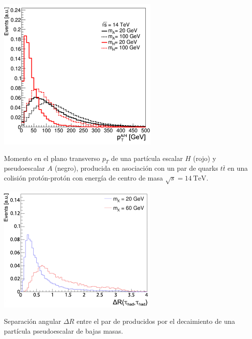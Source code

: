 \begin{marginfigure}
  \centering
  \includegraphics[width=\linewidth]{Assets/Plots/ttX/h_A-H_pT.pdf}
  \caption{Momento en el plano transverso $p_T$ de una partícula escalar $H$ (rojo) y pseudoescalar $A$ (negro), producida en asociación con un par de quarks $t\bar{t}$ en una colisión protón-protón con energía de centro de masa $\sqrt{s} = \SI{14}{\TeV}$.}
  \label{fig:ch1:pseudoscalars:A-vs-H_pT}
\end{marginfigure}

\begin{marginfigure}
  \centering
  \includegraphics[width=\linewidth]{Assets/Plots/ttX/h_A_DeltaR.pdf}
  \caption{Separación angular $\Delta R$ entre el par de \ttaus producidos por el decaimiento de una partícula pseudoescalar de bajas masas.}
  \label{fig:ch1:pseudoscalars:A_DeltaR}
\end{marginfigure}

